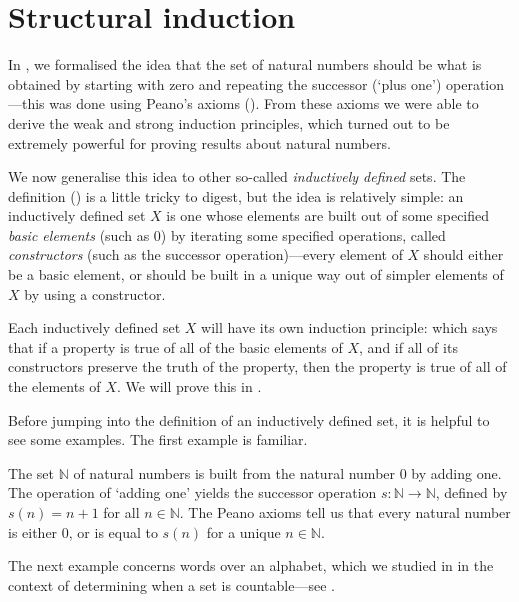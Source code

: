 \section{Structural induction}
\label{secStructuralInduction}

In , we formalised the idea that the set of natural numbers should be what is obtained by starting with zero and repeating the successor (`plus one') operation---this was done using Peano's axioms (). From these axioms we were able to derive the weak and strong induction principles, which turned out to be extremely powerful for proving results about natural numbers.

We now generalise this idea to other so-called \textit{inductively defined} sets. The definition () is a little tricky to digest, but the idea is relatively simple: an inductively defined set $X$ is one whose elements are built out of some specified \textit{basic elements} (such as $0$) by iterating some specified operations, called \textit{constructors} (such as the successor operation)---every element of $X$ should either be a basic element, or should be built in a unique way out of simpler elements of $X$ by using a constructor.

Each inductively defined set $X$ will have its own induction principle: which says that if a property is true of all of the basic elements of $X$, and if all of its constructors preserve the truth of the property, then the property is true of all of the elements of $X$. We will prove this in .

Before jumping into the definition of an inductively defined set, it is helpful to see some examples. The first example is familiar.

\begin{example}
\label{exNaturalNumbersAsInductivelyDefinedSetPreliminary}
The set $\mathbb{N}$ of natural numbers is built from the natural number $0$ by adding one. The operation of `adding one' yields the successor operation $s : \mathbb{N} \to \mathbb{N}$, defined by $s(n)=n+1$ for all $n \in \mathbb{N}$. The Peano axioms tell us that every natural number is either $0$, or is equal to $s(n)$ for a unique $n \in \mathbb{N}$.
\end{example}

The next example concerns words over an alphabet, which we studied in  in the context of determining when a set is countable---see .

